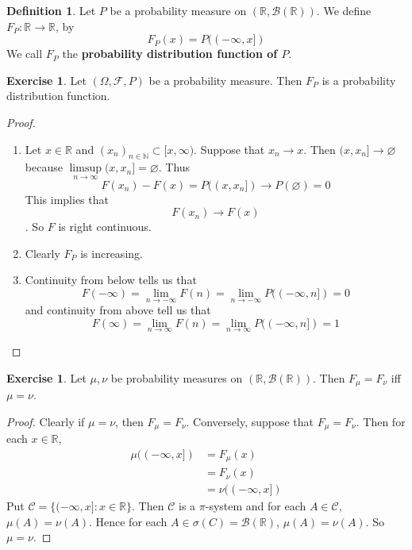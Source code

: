 \documentclass[12pt]{amsart}
\theoremstyle{definition}
\newtheorem{defn}[definition]{Definition}
\newtheorem{ex}[definition]{Exercise}
\newcommand{\sig}{\sigma}
\newcommand{\Om}{\Omega}
\newcommand{\N}{\mathbb{N}}
\newcommand{\R}{\mathbb{R}}
\newcommand{\MC}{\mathcal{C}}
\newcommand{\MB}{\mathcal{B}}
\newcommand{\MF}{\mathcal{F}}
\begin{document}
	\begin{defn}
		Let $P $ be a probability measure on $(\R, \MB(\R))$. We define $F_P: \R \rightarrow \R$, by $$F_P(x) = P((-\infty, x])$$ We call $F_P$ the \textbf{probability distribution function of $P$}.
	\end{defn}
	
	\begin{ex}
		Let $(\Om, \MF, P)$ be a probability measure. Then $F_P$ is a probability distribution function.
	\end{ex}
	
	\begin{proof}
		\begin{enumerate}
			\item Let $x \in \R$ and $(x_n)_{n \in \N} \subset [x, \infty)$. Suppose that $x_n \rightarrow x$. Then $(x, x_n] \rightarrow \varnothing$ because $\limsup\limits_{n \rightarrow \infty} (x,x_n] = \varnothing$. Thus $$F(x_n) - F(x) = P((x, x_n]) \rightarrow P(\varnothing) = 0$$This implies that $$F(x_n) \rightarrow F(x)$$. So $F$ is right continuous.
			\item Clearly $F_P$ is increasing.
			\item Continuity from below tells us that $$F(-\infty) = \lim_{n \rightarrow -\infty}F(n) = \lim_{n \rightarrow -\infty}P((-\infty,n]) = 0$$ and continuity from above tell us that $$F(\infty)  = \lim_{n \rightarrow \infty}F(n) = \lim_{n \rightarrow \infty}P((-\infty, n]) = 1$$ 
		\end{enumerate}
	\end{proof}
	
	\begin{ex}
		Let $\mu, \nu$ be probability measures on $(\R, \MB(\R))$. Then $F_{\mu} = F_{\nu}$ iff $\mu = \nu$.  
	\end{ex}
	
	\begin{proof}
		Clearly if $\mu = \nu$, then $F_{\mu} = F_{\nu}$. Conversely, suppose that $F_{\mu} = F_{\nu}$. Then for each $x \in \R$, 
		\begin{align*}
			\mu((-\infty,x]) 
			&= F_{\mu}(x) \\
			&= F_{\nu}(x)  \\
			&= \nu((-\infty,x])
		\end{align*}
		Put $\MC = \{(-\infty,x]:x \in \R\} $. Then $\MC$ is a $\pi$-system and for each $A \in \MC$, $\mu(A) = \nu(A)$. Hence for each $A \in \sig(C) = \MB(\R)$, $\mu(A) = \nu(A)$. So $\mu = \nu$. 
	\end{proof}
	
\end{document}

